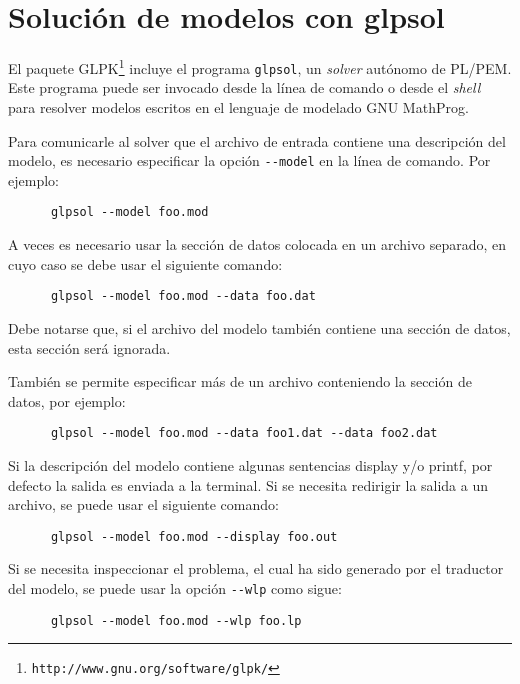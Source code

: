 \documentclass[11pt,spanish]{report}
\begin{document}

\chapter{Solución de modelos con glpsol}

El paquete GLPK\footnote{{\tt http://www.gnu.org/software/glpk/}} incluye el programa {\tt glpsol}, un {\it solver} autónomo de PL/PEM. Este programa puede ser invocado desde la línea de comando o desde el {\it shell} para resolver modelos escritos en el lenguaje de modelado GNU MathProg.

Para comunicarle al solver que el archivo de entrada contiene una descripción del modelo, es necesario especificar la opción \verb|--model| en la línea de comando. Por ejemplo:

\begin{verbatim}
      glpsol --model foo.mod
\end{verbatim}

A veces es necesario usar la sección de datos colocada en un archivo separado, en cuyo caso se debe usar el siguiente comando:

\begin{verbatim}
      glpsol --model foo.mod --data foo.dat
\end{verbatim}

\noindent Debe notarse que, si el archivo del modelo también contiene una sección de datos, esta sección será ignorada.

También se permite especificar más de un archivo conteniendo la sección de datos, por ejemplo:

\begin{verbatim}
      glpsol --model foo.mod --data foo1.dat --data foo2.dat
\end{verbatim}

Si la descripción del modelo contiene algunas sentencias display y/o printf, por defecto la salida es enviada a la terminal. Si se necesita redirigir la salida a un archivo, se puede usar el siguiente comando:

\begin{verbatim}
      glpsol --model foo.mod --display foo.out
\end{verbatim}

Si se necesita inspeccionar el problema, el cual ha sido generado por el traductor del modelo, se puede usar la opción \verb|--wlp| como sigue:

\begin{verbatim}
      glpsol --model foo.mod --wlp foo.lp
\end{verbatim}
\end{document}
